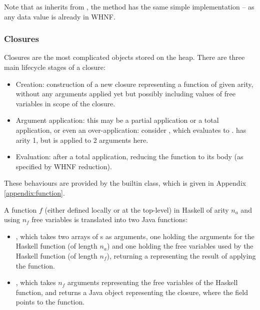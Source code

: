 \documentclass[dissertation.tex]{subfiles}
\begin{document}
{{{            Note that as  inherits from , the  method has the same simple implementation -- as any data value is already in WHNF.
        }
        \subsubsection{Closures}\label{sec:closures}
        {
            Closures are the most complicated objects stored on the heap. There are three main lifecycle stages of a closure:

            \begin{itemize}
            \item
            {
                Creation: construction of a new closure representing a function of given arity, without any arguments applied yet but possibly including values of free variables in scope of the closure.
            }
            \item
            {
                Argument application: this may be a partial application or a total application, or even an over-application: consider , which evaluates to .  has arity 1, but is applied to 2 arguments here.
            }
            \item
            {
                Evaluation: after a total application, reducing the function to its body (as specified by WHNF reduction).
            }
            \end{itemize}

            These behaviours are provided by the  builtin class, which is given in Appendix \ref{appendix:function}.

            A function \(f\) (either defined locally or at the top-level) in Haskell of arity \(n_a\) and using \(n_f\) free variables is translated into two Java functions:
            
            \begin{itemize}
            \item
            {
                , which takes two arrays of s as arguments, one holding the arguments for the Haskell function (of length \(n_a\)) and one holding the free variables used by the Haskell function (of length \(n_f\)), returning a  representing the result of applying the function.
            }
            \item
            {
                , which takes \(n_f\) arguments representing the free variables of the Haskell function, and returns a Java  object representing the closure, where the  field points to the  function.
            }
            \end{itemize}
            
}}}
\end{document}
